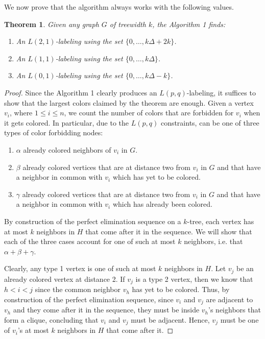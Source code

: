 \documentclass[12pt,a4paper]{article}
\newtheorem{theorem}{Theorem}
\begin{document}
	\newpage

	We now prove that the algorithm always works with the following values.
	\begin{theorem}
		Given any graph $G$ of treewidth $k$, the Algorithm 1 finds:
		\begin{enumerate}
			\item An $L(2, 1)$-labeling using the set $\{0, \ldots, k\Delta + 2k\}$.
			\item An $L(1, 1)$-labeling using the set $\{0, \ldots, k\Delta\}$.
			\item An $L(0, 1)$-labeling using the set $\{0, \ldots, k\Delta-k\}$.
		\end{enumerate}
	\end{theorem}

	\begin{proof}
		Since the Algorithm 1 clearly produces an $L(p,q)$-labeling, it suffices to show that the largest colors claimed by the theorem are enough. Given a vertex $v_i$, where $1 \leq i \leq n$, we count the number of colors that are forbidden for $v_i$ when it gets colored. In particular, due to the $L(p,q)$ constraints,  can be one of three types of color forbidding nodes:
		\begin{enumerate}
			\item $\alpha$ already colored neighbors of $v_i$ in $G$.
			\item $\beta$ already colored vertices that are at distance two from $v_i$ in $G$ and that have a neighbor in common with $v_i$ which has yet to be colored.
			\item $\gamma$ already colored vertices that are at distance two from $v_i$ in $G$ and that have a neighbor in common with $v_i$ which has already been colored.
		\end{enumerate}

		By construction of the perfect elimination sequence on a $k$-tree, each vertex has at most $k$ neighbors in $H$ that come after it in the sequence. We will show that each of the three cases account for one of such at most $k$ neighbors, i.e. that $\alpha + \beta + \gamma$.
		
		Clearly, any type 1 vertex is one of such at most $k$ neighbors in $H$. Let $v_j$ be an already colored vertex at distance 2. If $v_j$ is a type 2 vertex, then we know that $h < i < j$ since the common neighbor $v_h$ has yet to be colored. Thus, by construction of the perfect elimination sequence, since $v_i$ and $v_j$ are adjacent to $v_h$ and they come after it in the sequence, they must be inside $v_h$'s neighbors that form a clique, concluding that $v_i$ and $v_j$ must be adjacent. Hence, $v_j$ must be one of $v_i$'s at most $k$ neighbors in $H$ that come after it.


\end{proof}
\end{document}
